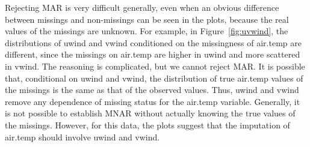 \documentclass[article]{jss}
\begin{document}
Rejecting MAR is very difficult generally, even when an obvious
difference between missings and non-missings can be seen in the
plots, because the real values of the missings are unknown. For
example, in Figure~\ref{fig:uvwind}, the distributions of uwind
and vwind conditioned on the missingness of air.temp are different,
since the missings on air.temp are higher in uwind and more
scattered in vwind. The reasoning is complicated, but we cannot
reject MAR. It is possible that, conditional on uwind and vwind,
the distribution of true air.temp values of the missings is the
same as that of the observed values. Thus, uwind and vwind remove
any dependence of missing status for the air.temp variable.
Generally, it is not possible to establish MNAR without actually
knowing the true values of the missings. However, for this data,
the plots suggest that the imputation of air.temp should involve
uwind and vwind.
\end{document}
